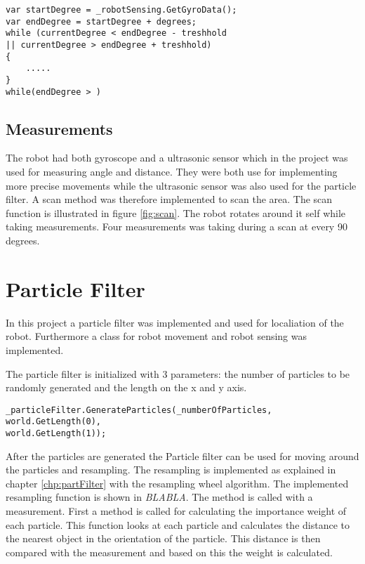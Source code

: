 \lstset{style=sharpc}
\begin{lstlisting}[caption={Pseduo code for turning the robot}, label=lst:turn, mathescape=true]             
var startDegree = _robotSensing.GetGyroData();
var endDegree = startDegree + degrees;
while (currentDegree < endDegree - treshhold 
|| currentDegree > endDegree + treshhold)
{	
	.....
}
while(endDegree > )
\end{lstlisting}


\FloatBarrier
\subsection{Measurements}
The robot had both gyroscope and a ultrasonic sensor which in the project was used for measuring angle and distance. They were both use for implementing more precise movements while the ultrasonic sensor was also used for the particle filter. A scan method was therefore implemented to scan the area. The scan function is illustrated in figure \ref{fig:scan}. The robot rotates around it self while taking measurements. Four measurements was taking during a scan at every 90 degrees.


\FloatBarrier
\section{Particle Filter}
In this project a particle filter was implemented and used for localiation of the robot. Furthermore a class for robot movement and robot sensing was implemented. 

The particle filter is initialized with 3 parameters: the number of particles to be randomly generated and the length on the x and y axis.

\lstset{style=sharpc}
\begin{lstlisting}[caption={Initialization of the particle filter}, label=lst:initPart, mathescape=true]             
_particleFilter.GenerateParticles(_numberOfParticles, world.GetLength(0),
world.GetLength(1));
\end{lstlisting}

After the particles are generated the Particle filter can be used for moving around the particles and resampling. The resampling is implemented as explained in chapter \ref{chp:partFilter} with the resampling wheel algorithm. The implemented resampling function is shown in \emph{BLABLA}. The method is called with a measurement. First a method is called for calculating the importance weight of each particle. This function looks at each particle and calculates the distance to the nearest object in the orientation of the particle. This distance is then compared with the measurement and based on this the weight is calculated.

